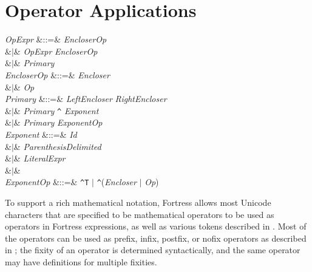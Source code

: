 %
%
%
%

\section{Operator Applications}

\begin{Grammar}
\emph{OpExpr}
&::=& \emph{EncloserOp}   \\
&$|$& \emph{OpExpr} \emph{EncloserOp}  \\
&$|$& \emph{Primary}\\

\emph{EncloserOp} &::=& \emph{Encloser}\\
&$|$& \emph{Op}\\

\emph{Primary}
&::=& \emph{LeftEncloser}   \emph{RightEncloser} \\
&$|$& \emph{Primary} \verb+^+ \emph{Exponent}\\
&$|$& \emph{Primary} \emph{ExponentOp}\\

\emph{Exponent}
&::=& \emph{Id}\\
&$|$& \emph{ParenthesisDelimited}\\
&$|$& \emph{LiteralExpr}\\
&$|$& \\

\emph{ExponentOp} &::=& \verb+^T+ $|$ \verb+^+(\emph{Encloser} $|$ \emph{Op})\\

\end{Grammar}

To support a rich mathematical notation, Fortress allows most Unicode
characters that are specified to be mathematical operators to be used as
operators in Fortress expressions, as well as various tokens described in
.
Most of the operators can be used as prefix, infix, postfix, or
nofix operators as described in ;
the fixity of an operator is determined syntactically, and
the same operator may have definitions for multiple fixities.

